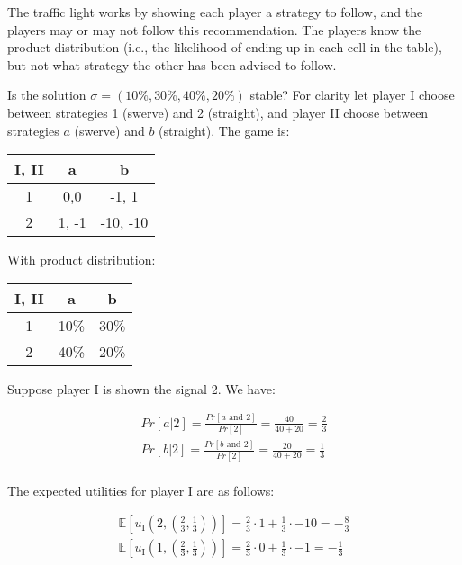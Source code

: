 The traffic light works by showing each player a strategy to follow, and the
players may or may not follow this recommendation. The players know the product
distribution (i.e., the likelihood of ending up in each cell in the table), but
not what strategy the other has been advised to follow.

Is the solution $\sigma = (10\%, 30\%, 40\%, 20\%)$ stable? For clarity let
player I choose between strategies 1 (swerve) and 2 (straight), and player II
choose between strategies $a$ (swerve) and $b$ (straight).  The game is:

\begin{center}
	\begin{tabular}{|c|c|c|}
		\hline
		\textbf{I, II} & a     & b \\ \hline
		1              & 0,0   & -1, 1 \\ \hline
		2              & 1, -1 & -10, -10 \\ \hline
	\end{tabular}
\end{center}

With product distribution:

\begin{center}
	\begin{tabular}{|c|c|c|}
		\hline
		\textbf{I, II} & a    & b \\ \hline
		1              & 10\% & 30\% \\ \hline
		2              & 40\% & 20\% \\ \hline
	\end{tabular}
\end{center}

Suppose player I is shown the signal 2. We have:

\begin{equation*}
	\begin{split}
		Pr[a|2] = \frac{Pr[a \text{ and } 2]}{Pr[2]} = \frac{40}{40+20}
		= \frac{2}{3} \\
		Pr[b|2] = \frac{Pr[b \text{ and } 2]}{Pr[2]} = \frac{20}{40+20}
		= \frac{1}{3} \\
	\end{split}
\end{equation*}

The expected utilities for player I are as follows:

\begin{equation*}
	\begin{split}
		\mathbb{E}[u_\text{I}(2, (\frac{2}{3}, \frac{1}{3}))] =
		\frac{2}{3} \cdot 1 + \frac{1}{3} \cdot -10 = -\frac{8}{3} \\
		\mathbb{E}[u_\text{I}(1, (\frac{2}{3}, \frac{1}{3}))] =
		\frac{2}{3} \cdot 0 + \frac{1}{3} \cdot -1 = -\frac{1}{3} \\
	\end{split}
\end{equation*}

